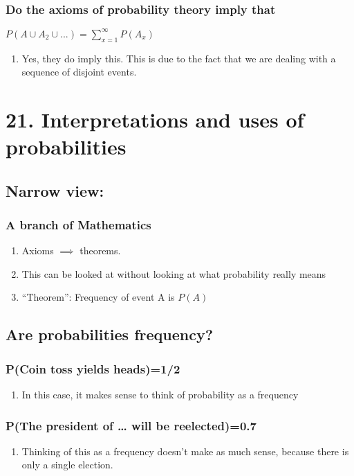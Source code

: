 \documentclass[11pt]{article}
\begin{document}
\subsubsection{Do the axioms of probability theory imply that}
\label{sec:org344be6f}
\(P(A \cup A_2 \cup ...) = \sum_{x=1}^\infty P(A_x)\)
\begin{enumerate}
\item Yes, they do imply this. This is due to the fact that we are dealing with a sequence of disjoint events.
\label{sec:org6f04c63}
\end{enumerate}
\section{21. Interpretations and uses of probabilities}
\label{sec:org9577916}
\subsection{Narrow view:}
\label{sec:org4295648}
\subsubsection{A branch of Mathematics}
\label{sec:org327645d}
\begin{enumerate}
\item Axioms \(\implies\) theorems.
\label{sec:org9286a8d}
\item This can be looked at without looking at what probability really means
\label{sec:org800e0a8}
\item ``Theorem'': Frequency of event A is \(P(A)\)
\label{sec:org72e11d3}
\end{enumerate}
\subsection{Are probabilities frequency?}
\label{sec:orgff31172}
\subsubsection{P(Coin toss yields heads)=1/2}
\label{sec:org0cd8215}
\begin{enumerate}
\item In this case, it makes sense to think of probability as a frequency
\label{sec:org5240605}
\end{enumerate}
\subsubsection{P(The president of \ldots{} will be reelected)=0.7}
\label{sec:org30b9a34}
\begin{enumerate}
\item Thinking of this as a frequency doesn't make as much sense, because there is only a single election.
\label{sec:org96d060d}
\end{enumerate}
\end{document}
